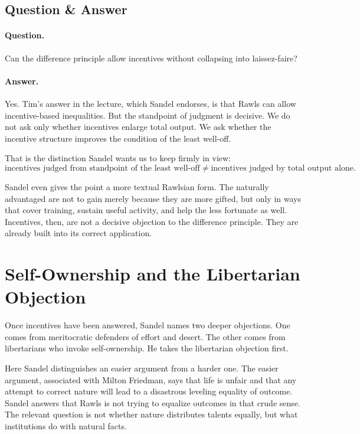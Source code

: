 \subsection{Question \& Answer}

\paragraph{Question.} Can the difference principle allow incentives without collapsing into laissez-faire?

\paragraph{Answer.} Yes. Tim's answer in the lecture, which Sandel endorses, is that Rawls can allow incentive-based inequalities. But the standpoint of judgment is decisive. We do not ask only whether incentives enlarge total output. We ask whether the incentive structure improves the condition of the least well-off.

That is the distinction Sandel wants us to keep firmly in view:
\begin{equation}
\text{incentives judged from standpoint of the least well-off}
\neq
\text{incentives judged by total output alone}.
\end{equation}

Sandel even gives the point a more textual Rawlsian form. The naturally advantaged are not to gain merely because they are more gifted, but only in ways that cover training, sustain useful activity, and help the less fortunate as well. Incentives, then, are not a decisive objection to the difference principle. They are already built into its correct application.

\section{Self-Ownership and the Libertarian Objection}

Once incentives have been answered, Sandel names two deeper objections. One comes from meritocratic defenders of effort and desert. The other comes from libertarians who invoke self-ownership. He takes the libertarian objection first.

Here Sandel distinguishes an easier argument from a harder one. The easier argument, associated with Milton Friedman, says that life is unfair and that any attempt to correct nature will lead to a disastrous leveling equality of outcome. Sandel answers that Rawls is not trying to equalize outcomes in that crude sense. The relevant question is not whether nature distributes talents equally, but what institutions do with natural facts.

